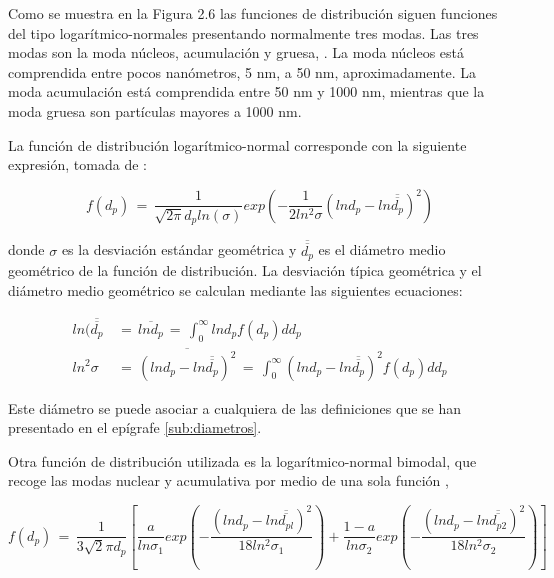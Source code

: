 \par Como se muestra en la Figura 2.6 las funciones de distribución siguen funciones del tipo logarítmico-normales presentando normalmente tres modas. Las tres modas son la moda núcleos, acumulación y gruesa, \cite{kittlesonetal:1998}. La moda núcleos está comprendida entre pocos nanómetros, 5 nm, a 50 nm, aproximadamente. La moda acumulación está comprendida entre 50 nm y 1000 nm, mientras que la moda gruesa son partículas mayores a 1000 nm.

\par La función de distribución logarítmico-normal corresponde con la siguiente expresión, tomada de \cite{friedlander:2000}:

\begin{equation}
\label{ec:distribucionlogaritmico-normal}
f(d_p)\,=\,\dfrac{1}{\sqrt{2 \pi} d_p ln(\sigma)} exp\left( -\dfrac{1}{2 ln^2 \sigma} \left( lnd_p - ln \overline{\overline{d_p}} \right)^2 \right)
\end{equation}

donde $\sigma$ es la desviación estándar geométrica y $\overline{\overline{d_p}}$ es el diámetro medio geométrico de la función de distribución. La desviación típica geométrica y el diámetro medio geométrico se calculan mediante las siguientes ecuaciones:

\begin{align}
\label{ec:desviaciontipicageometrica}
ln(\overline{\overline{d_p}}\, & =\,\overline{lnd_p}\,=\,\int_0^\infty lnd_p f(d_p) dd_p \\
\label{ec:diametromediogeometrico}
ln^2 \sigma\, & =\,\overline{\left(ln d_p - ln \overline{\overline{d_p}} \right)^2}\,=\, \int_0^\infty \left( lnd_p - ln \overline{\overline{d_p}} \right)^2 f(d_p)dd_p
\end{align}

\par Este diámetro se puede asociar a cualquiera de las definiciones que se han presentado en el epígrafe \ref{sub:diametros}.

\par Otra función de distribución utilizada es la logarítmico-normal bimodal, que recoge las modas nuclear y acumulativa por medio de una sola función \cite{kazakovetal:1998},

\begin{equation}
\label{ec:logartimico-normalbimodal}
f(d_p)\,=\,\dfrac{1}{3\sqrt{2} \pi d_p}\left[ \dfrac{a}{ln \sigma_1} exp\left( - \dfrac{\left( lnd_p - ln \overline{\overline{d_{pl}}} \right)^2}{18ln^2 \sigma_1} \right)  + \dfrac{1-a}{ln \sigma_2}exp\left( - \dfrac{\left( lnd_p - ln \overline{\overline{d_{p2}}} \right)^2}{18ln^2 \sigma_2} \right) \right]
\end{equation}

